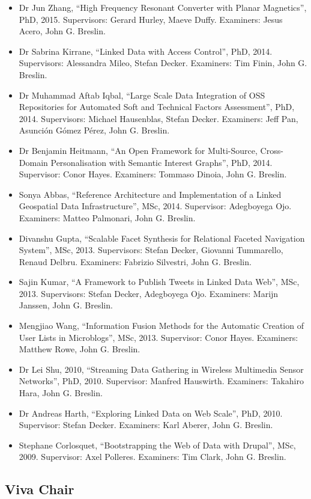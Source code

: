 \documentclass[10pt,a4paper]{res} %
\begin{document}
\begin{resume}
\begin{itemize}
\item Dr Jun Zhang, ``High Frequency Resonant Converter with Planar Magnetics'', PhD, 2015. Supervisors: Gerard Hurley, Maeve Duffy. Examiners: Jesus Acero, John G. Breslin.
\item Dr Sabrina Kirrane, ``Linked Data with Access Control'', PhD, 2014. Supervisors: Alessandra Mileo, Stefan Decker. Examiners: Tim Finin, John G. Breslin.
\item Dr Muhammad Aftab Iqbal, ``Large Scale Data Integration of OSS Repositories for Automated Soft and Technical Factors Assessment'', PhD, 2014. Supervisors: Michael Hausenblas, Stefan Decker. Examiners: Jeff Pan, Asunci\'{o}n G\'{o}mez P\'{e}rez, John G. Breslin.
\item Dr Benjamin Heitmann, ``An Open Framework for Multi-Source, Cross-Domain Personalisation with Semantic Interest Graphs'', PhD, 2014. Supervisor: Conor Hayes. Examiners: Tommaso Dinoia, John G. Breslin.
\item Sonya Abbas, ``Reference Architecture and Implementation of a Linked Geospatial Data Infrastructure'', MSc, 2014. Supervisor: Adegboyega Ojo. Examiners: Matteo Palmonari, John G. Breslin.
\item Divanshu Gupta, ``Scalable Facet Synthesis for Relational Faceted Navigation System'', MSc, 2013. Supervisors: Stefan Decker, Giovanni Tummarello, Renaud Delbru. Examiners: Fabrizio Silvestri, John G. Breslin.
\item Sajin Kumar, ``A Framework to Publish Tweets in Linked Data Web'', MSc, 2013. Supervisors: Stefan Decker, Adegboyega Ojo. Examiners: Marijn Janssen, John G. Breslin.
\item Mengjiao Wang, ``Information Fusion Methods for the Automatic Creation of User Lists in Microblogs'', MSc, 2013. Supervisor: Conor Hayes. Examiners: Matthew Rowe, John G. Breslin.
\item Dr Lei Shu, 2010, ``Streaming Data Gathering in Wireless Multimedia Sensor Networks'', PhD, 2010. Supervisor: Manfred Hauswirth. Examiners: Takahiro Hara, John G. Breslin.
\item Dr Andreas Harth, ``Exploring Linked Data on Web Scale'', PhD, 2010. Supervisor: Stefan Decker. Examiners: Karl Aberer, John G. Breslin.
\item Stephane Corlosquet, ``Bootstrapping the Web of Data with Drupal'', MSc, 2009. Supervisor: Axel Polleres. Examiners: Tim Clark, John G. Breslin.
\end{itemize}

\subsection*{Viva Chair}


\end{resume}
\end{document}
